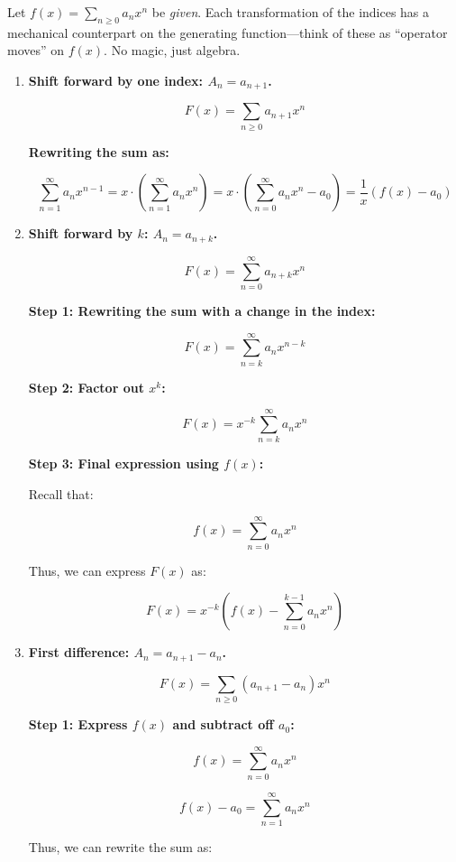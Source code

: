 \documentclass[docmute]{article}
\begin{document}
Let $f(x)=\sum_{n\ge0} a_{n}x^{n}$ be \emph{given}.  Each transformation of the
indices has a mechanical counterpart on the generating function—think of these
as “operator moves” on $f(x)$.  No magic, just algebra.

\begin{enumerate}[label=\textbf{2(\alph*)}\quad]

\item \textbf{Shift forward by one index: $A_{n}=a_{n+1}$.}

\[
F(x) = \sum_{n \geq 0} a_{n+1} x^n
\]

\textbf{Rewriting the sum as:}

\[
\sum_{n=1}^{\infty} a_n x^{n-1} = x \cdot \left( \sum_{n=1}^{\infty} a_n x^n \right) = x \cdot \left( \sum_{n=0}^{\infty} a_n x^n - a_0 \right)= \frac{1}{x} \left( f(x) - a_0 \right)
\]

\medskip\item \textbf{Shift forward by $k$: $A_{n}=a_{n+k}$.}

\[
F(x) = \sum_{n=0}^{\infty} a_{n+k} x^n
\]

\textbf{Step 1: Rewriting the sum with a change in the index:}

\[
F(x) = \sum_{n=k}^{\infty} a_n x^{n-k}
\]

\textbf{Step 2: Factor out \(x^k\):}

\[
F(x) = x^{-k} \sum_{n=k}^{\infty} a_n x^n
\]

\textbf{Step 3: Final expression using \(f(x)\):}

Recall that:

\[
f(x) = \sum_{n=0}^{\infty} a_n x^n
\]

Thus, we can express \(F(x)\) as:

\[
F(x) = x^{-k} \left( f(x) - \sum_{n=0}^{k-1} a_n x^n \right)
\]

\medskip\item \textbf{First difference: $A_{n}=a_{n+1}-a_{n}$.}


\[
F(x) = \sum_{n \geq 0} (a_{n+1} - a_n) x^n
\]

\textbf{Step 1: Express \(f(x)\) and subtract off \(a_0\):}

\[
f(x) = \sum_{n=0}^{\infty} a_n x^n
\]

\[
f(x) - a_0 = \sum_{n=1}^{\infty} a_n x^n
\]

Thus, we can rewrite the sum as:


\end{enumerate}
\end{document}
